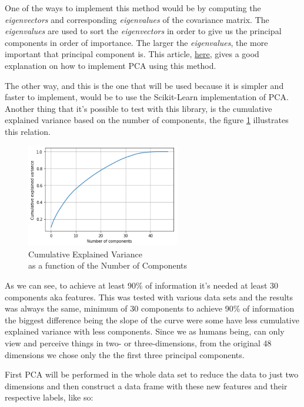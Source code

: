 One of the ways to implement this method would be by computing the \textit{eigenvectors} and corresponding \textit{eigenvalues} of the covariance matrix. The \textit{eigenvalues} are used to sort the \textit{eigenvectors} in order to give us the principal components in order of importance. The larger the \textit{eigenvalues}, the more important that principal component is. This article, \href{https://sebastianraschka.com/Articles/2014_pca_step_by_step.html#1-taking-the-whole-dataset-ignoring-the-class-labels}{here}, gives a good explanation on how to implement PCA using this method.

The other way, and this is the one that will be used because it is simpler and faster to implement, would be to use the Scikit-Learn implementation of PCA. Another thing that it's possible to test with this library, is the cumulative explained variance based on the number of components, the figure \ref{fig:variance_graph} illustrates this relation. 

\begin{figure}[h]
    \centering
    \includegraphics[width=0.6\textwidth,height=0.2\textheight]{Chapters/Figures/number_of_components.png}
    \caption{Cumulative Explained Variance\\ as a function of the Number of Components}
    \label{fig:variance_graph}
\end{figure}

As we can see, to achieve at least 90\% of information it's needed at least 30 components aka features. This was tested with various data sets and the results was always the same, minimum of 30 components to achieve 90\% of information the biggest difference being the slope of the curve were some have less cumulative explained variance with less components. Since we as humans being, can only view and perceive things in two- or three-dimensions, from the original 48 dimensions we chose only the the first three principal components.

First PCA will be performed in the whole data set to reduce the data to just two dimensions and then construct a data frame with these new features and their respective labels, like so:

